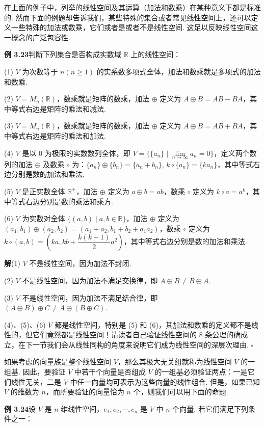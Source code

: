 \documentclass[UTF8,12pt,a4paper,fontset=fandol]{ctexart}
\begin{document}
在上面的例子中，列举的线性空间及其运算（加法和数乘）在某种意义下都是标准的. 然而下面的例题却告诉我们，某些特殊的集合或者常见线性空间上，还可以定义一些特殊的加法或数乘，它们或者是或者不是线性空间. 这足以反映线性空间这一概念的广泛包容性.

\noindent\textbf{例 3.23}\quad 判断下列集合是否构成实数域 $\mathbb{R}$ 上的线性空间：

(1) $V$ 为次数等于 $n(n\ge 1)$ 的实系数多项式全体，加法和数乘就是多项式的加法和数乘.

(2) $V=M_n(\mathbb{R})$，数乘就是矩阵的数乘，加法 $\oplus$ 定义为 $A\oplus B=AB-BA$，其中等式右边是矩阵的乘法和减法.

(3) $V=M_n(\mathbb{R})$，数乘就是矩阵的数乘，加法 $\oplus$ 定义为 $A\oplus B=AB+BA$，其中等式右边是矩阵的乘法和加法.

(4) $V$ 是以 0 为极限的实数数列全体，即 $V=\{\{a_n\}\mid \lim\limits_{n\to\infty}a_n=0\}$，定义两个数列的加法 $\oplus$ 及数乘 $\circ$ 为：$\{a_n\}\oplus\{b_n\}=\{a_n+b_n\}$, $k\circ\{a_n\}=\{ka_n\}$，其中等式右边分别是数的加法和乘法.

(5) $V$ 是正实数全体 $\mathbb{R}^+$，加法 $\oplus$ 定义为 $a\oplus b=ab$，数乘 $\circ$ 定义为 $k\circ a=a^k$，其中等式右边分别是数的乘法和乘方.

(6) $V$ 为实数对全体 $\{(a,b)\mid a,b\in\mathbb{R}\}$，加法 $\oplus$ 定义为 $(a_1,b_1)\oplus(a_2,b_2)=(a_1+a_2,b_1+b_2+a_1a_2)$，数乘 $\circ$ 定义为 $k\circ(a,b)=\left(ka,kb+\dfrac{k(k-1)}{2}a^2\right)$，其中等式右边分别是数的加法和乘法.

\noindent\textbf{解}\quad (1) $V$ 不是线性空间，因为加法不封闭.

(2) $V$ 不是线性空间，因为加法不满足交换律，即 $A\oplus B\ne B\oplus A$.

(3) $V$ 不是线性空间，因为加法不满足结合律，即 $(A\oplus B)\oplus C\ne A\oplus(B\oplus C)$.

(4)、(5)、(6) $V$ 都是线性空间，特别是 (5) 和 (6)，其加法和数乘的定义都不是线性的，但它们竟然都是线性空间！请读者自己验证线性空间的 8 条公理的确成立，在下一节我们会从线性同构的角度来说明它们成为线性空间的深层次理由. $\square$

如果考虑的向量族是整个线性空间 $V$，那么其极大无关组就称为线性空间 $V$ 的一组基. 因此，要验证 $V$ 中若干个向量是否组成 $V$ 的一组基必须验证两点：一是它们线性无关，二是 $V$ 中任一向量均可表示为这些向量的线性组合. 但是，如果已知 $V$ 的维数为 $n$，而所要验证的向量恰为 $n$ 个，则我们可以用下面的命题.

\noindent\textbf{例 3.24}\quad 设 $V$ 是 $n$ 维线性空间，$e_1,e_2,\cdots,e_n$ 是 $V$ 中 $n$ 个向量. 若它们满足下列条件之一：
\end{document}
